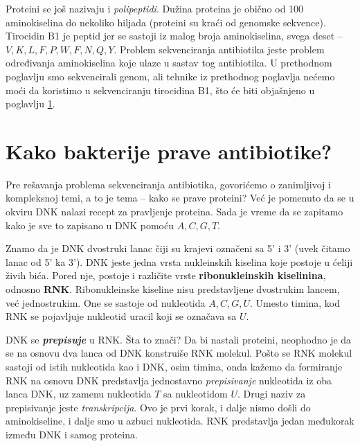 Proteini se još nazivaju i \textit{polipeptidi}. Dužina proteina je obično od 100 aminokiselina do nekoliko hiljada (proteini su kraći od genomske sekvence). Tirocidin B1 je peptid jer se sastoji iz malog broja aminokiselina, svega deset -- $ V,K,L,F,P,W,F,N,Q,Y$. Problem sekvenciranja antibiotika jeste problem određivanja aminokiselina koje ulaze u sastav tog antibiotika. U prethodnom poglavlju smo sekvencirali genom, ali tehnike iz prethodnog poglavlja nećemo moći da koristimo u sekvenciranju tirocidina B1, što će biti objašnjeno u poglavlju \ref{pravljenje}.


\section{Kako bakterije prave antibiotike?} \label{pravljenje}

Pre rešavanja problema sekvenciranja antibiotika, govorićemo o zanimljivoj i kompleksnoj temi, a to je tema -- kako se prave proteini? Već je pomenuto da se u okviru DNK nalazi recept za pravljenje proteina. Sada je vreme da se zapitamo kako je sve to zapisano u DNK pomoću $A, C, G, T$.

Znamo da je DNK dvostruki lanac čiji su krajevi označeni sa 5' i 3' (uvek čitamo lanac od 5' ka 3'). DNK jeste jedna vrsta nukleinskih kiselina koje postoje u ćeliji živih bića. Pored nje, postoje i različite vrste \textbf{ribonukleinskih kiselinina}, odnosno \textbf{RNK}. Ribonukleinske kiseline nisu predstavljene dvostrukim lancem, već jednostrukim. One se sastoje od nukleotida $A, C, G, U$. Umesto timina, kod RNK se pojavljuje nukleotid uracil koji se označava sa $U$. 

DNK se \textbf{\textit{prepisuje}} u RNK. Šta to znači? Da bi nastali proteini, neophodno je da se na osnovu dva lanca od DNK konstruiše RNK molekul. Pošto se RNK molekul sastoji od istih nukleotida kao i DNK, osim timina, onda kažemo da formiranje RNK na osnovu DNK predstavlja jednostavno \textit{prepisivanje} nukleotida iz oba lanca DNK, uz zamenu nukleotida $T$ sa nukleotidom $U$. Drugi naziv za prepisivanje jeste \textit{transkripcija}. Ovo je prvi korak, i dalje nismo došli do aminokiseline, i dalje smo u azbuci nukleotida. RNK predstavlja jedan međukorak između DNK i samog proteina.

